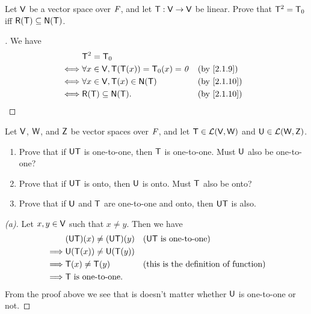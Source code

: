 \begin{ex}\label{ex:2.3.11}
  Let \(\mathsf{V}\) be a vector space over \(\mathit{F}\), and let \(\mathsf{T} : \mathsf{V} \to \mathsf{V}\) be linear.
  Prove that \(\mathsf{T}^2 = \mathsf{T}_0\) iff \(\rg{\T} \subseteq \ns{\T}\).
\end{ex}

\begin{proof}[]
  We have
  \begin{align*}
         & \T^2 = \zT                                                                \\
    \iff & \forall x \in \V, \T(\T(x)) = \zT(x) = \zv &  & \text{(by \cref{2.1.9})}  \\
    \iff & \forall x \in \V, \T(x) \in \ns{\T}        &  & \text{(by \cref{2.1.10})} \\
    \iff & \rg{\T} \subseteq \ns{\T}.                 &  & \text{(by \cref{2.1.10})}
  \end{align*}
\end{proof}

\begin{ex}\label{ex:2.3.12}
  Let \(\mathsf{V}\), \(\mathsf{W}\), and \(\mathsf{Z}\) be vector spaces over \(\mathit{F}\), and let \(\mathsf{T} \in \mathcal{L}(\mathsf{V}, \mathsf{W})\) and \(\mathsf{U} \in \mathcal{L}(\mathsf{W}, \mathsf{Z})\).
  \begin{enumerate}
    \item Prove that if \(\mathsf{U} \mathsf{T}\) is one-to-one, then \(\mathsf{T}\) is one-to-one.
          Must \(\mathsf{U}\) also be one-to-one?
    \item Prove that if \(\mathsf{U} \mathsf{T}\) is onto, then \(\mathsf{U}\) is onto.
          Must \(\mathsf{T}\) also be onto?
    \item Prove that if \(\mathsf{U}\) and \(\mathsf{T}\) are one-to-one and onto, then \(\mathsf{U} \mathsf{T}\) is also.
  \end{enumerate}
\end{ex}

\begin{proof}[(a)]
  Let \(x, y \in \mathsf{V}\) such that \(x \neq y\).
  Then we have
  \begin{align*}
             & (\mathsf{U} \mathsf{T})(x) \neq (\mathsf{U} \mathsf{T})(y) &  & \text{(\(\mathsf{U}\mathsf{T}\) is one-to-one)}            \\
    \implies & \mathsf{U}(\mathsf{T}(x)) \neq \mathsf{U}(\mathsf{T}(y))                                                    \\
    \implies & \mathsf{T}(x) \neq \mathsf{T}(y)           &  & \text{(this is the definition of function)} \\
    \implies & \mathsf{T} \text{ is one-to-one}.
  \end{align*}
  From the proof above we see that is doesn't matter whether \(\mathsf{U}\) is one-to-one or not.
\end{proof}

